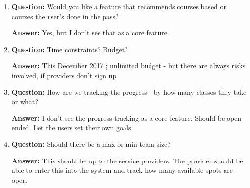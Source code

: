 \documentclass[12pt]{article}
\begin{document}
\begin{enumerate}
\item \textbf{Question:} Would you like a feature that recommends courses based on courses the user’s done in the pass?
 
\textbf{Answer:} Yes, but I don’t see that as a core feature

\item \textbf{Question:} Time constraints? Budget?

\textbf{Answer:} This December 2017 ; unlimited budget - but there are always risks involved, if providers don’t sign up 

\item \textbf{Question:} How are we tracking the progress - by how many classes they take or what?

\textbf{Answer:} I don’t see the progress tracking as a core feature. Should be open ended. Let the users set their own goals

\item \textbf{Question:} Should there be a max or min team size? 

\textbf{Answer:} This should be up to the service providers. The provider should be able to enter this into the system and track how many available spots are open.

\end{enumerate}
\end{document}
